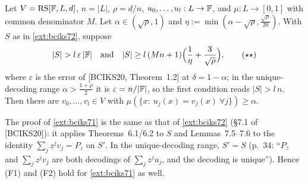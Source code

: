 \begin{imported}\label{ext:bciks71}
Let $V=\mathrm{RS}[\mathbb{F},L,d]$, $n=|L|$, $\rho=d/n$, $u_0,\dots,u_l:L\to\mathbb{F}$, and $\mu:L\to[0,1]$
with common denominator $M$. Let $\alpha\in(\sqrt\rho,1)$ and
$\eta:=\min(\alpha-\sqrt\rho,\frac{\sqrt\rho}{20})$. With $S$ as in \cref{ext:bciks72},
suppose
\[
|S|>l\,\varepsilon\,|\F|\quad\text{and}\quad|S|\ge l\,(Mn+1)\Big(\frac1\eta+\frac3{\sqrt\rho}\Big),\tag{$\star\star$}
\]
where $\varepsilon$ is the error of [BCIKS20, Theorem~1.2] at $\delta=1-\alpha$; in the
unique-decoding range $\alpha>\frac{1+\rho}2$ it is $\varepsilon=n/|\mathbb{F}|$, so the first
condition reads $|S|>l\,n$. Then there are $v_0,\dots,v_l\in V$ with
$\mu(\{x:\ u_j(x)=v_j(x)\ \forall j\})\ge\alpha$.
\end{imported}

\begin{remark}\label{ext:facts71}
The proof of \cref{ext:bciks71} is the same as that of \cref{ext:bciks72} (\S7.1 of
[BCIKS20]): it applies Theorems~6.1/6.2 to $S$ and Lemmas~7.5--7.6 to the identity
$\sum_jz^jv_j=P_z$ on $S'$. In the unique-decoding range, $S'=S$ (p.~34: ``$P_z$ and
$\sum_jz^jv_j$ are both decodings of $\sum_jz^ju_j$, and the decoding is unique'').
Hence (F1) and (F2) hold for \cref{ext:bciks71} as well.
\end{remark}
